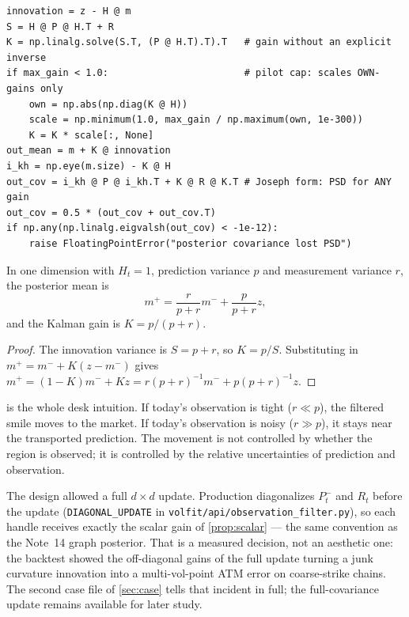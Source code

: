 \documentclass[11pt]{article}
\begin{document}
\begin{lstlisting}[caption={The production update (quoted from
\texttt{volfit/calib/observation\_filter.py}): \cref{eq:kalman} with the
own-gain pilot cap, Joseph covariance, and an explicit PSD guard.},
label={lst:crux}]
innovation = z - H @ m
S = H @ P @ H.T + R
K = np.linalg.solve(S.T, (P @ H.T).T).T   # gain without an explicit inverse
if max_gain < 1.0:                        # pilot cap: scales OWN-gains only
    own = np.abs(np.diag(K @ H))
    scale = np.minimum(1.0, max_gain / np.maximum(own, 1e-300))
    K = K * scale[:, None]
out_mean = m + K @ innovation
i_kh = np.eye(m.size) - K @ H
out_cov = i_kh @ P @ i_kh.T + K @ R @ K.T # Joseph form: PSD for ANY gain
out_cov = 0.5 * (out_cov + out_cov.T)
if np.any(np.linalg.eigvalsh(out_cov) < -1e-12):
    raise FloatingPointError("posterior covariance lost PSD")
\end{lstlisting}

\begin{proposition}
\label{prop:scalar}
In one dimension with $H_t=1$, prediction variance $p$ and measurement
variance $r$, the posterior mean is
\[
m^+=\frac{r}{p+r}m^-+\frac{p}{p+r}z,
\]
and the Kalman gain is $K=p/(p+r)$.
\end{proposition}

\begin{proof}
The innovation variance is $S=p+r$, so $K=p/S$. Substituting in
$m^+=m^-+K(z-m^-)$ gives
$m^+=(1-K)m^-+Kz=r(p+r)^{-1}m^-+p(p+r)^{-1}z$.
\end{proof}

 is the whole desk intuition. If today's observation is
tight ($r\ll p$), the filtered smile moves to the market. If today's
observation is noisy ($r\gg p$), it stays near the transported prediction. The
movement is not controlled by whether the region is observed; it is controlled
by the relative uncertainties of prediction and observation.

\begin{remark}
\label{rem:diagonal}
The design allowed a full $d\times d$ update. Production diagonalizes $P_t^-$
and $R_t$ before the update (\texttt{DIAGONAL\_UPDATE} in
\texttt{volfit/api/observation\_filter.py}), so each handle receives exactly
the scalar gain of \cref{prop:scalar} --- the same convention as the Note~14
graph posterior. That is a measured decision, not an aesthetic one: the
backtest showed the off-diagonal gains of the full update turning a junk
curvature innovation into a multi-vol-point ATM error on coarse-strike chains.
The second case file of \cref{sec:case} tells that incident in full; the
full-covariance update remains available for later study.
\end{remark}
\end{document}

